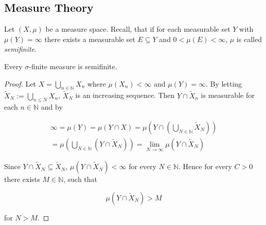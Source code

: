 \appendix
\begin{appendix}
	\section{Measure Theory}
	Let $(X,\mu)$ be a measure space. Recall, that if for each measurable set $Y$ with $\mu(Y) = \infty$ there exists a measurable set $E \subseteq Y$ and $0 < \mu(E) < \infty$, $\mu$ is called \emph{semifinite}.

		\begin{lemma}
			Every $\sigma$-finite measure is semifinite.
		\end{lemma}

		\begin{proof}
			Let $X = \bigcup_{n \in \mathbb{N}} X_n$ where $\mu(X_n) < \infty$ and $\mu(Y) = \infty$. By letting $\tilde{X}_N := \bigcup_{n \leqslant N} X_n$, $\tilde{X}_N$ is an increasing sequence. Then $Y \cap \tilde{X}_n$ is measurable for each $n \in \mathbb{N}$ and by \cite[10]{cohn:measure_theory:2013}

			\begin{multline*}
				\infty = \mu(Y) = \mu(Y \cap X) = \mu\left(Y \cap \left(\bigcup_{N \in \mathbb{N}} \tilde{X}_N\right)\right)\\ = \mu\left(\bigcup_{N \in \mathbb{N}} \left( Y \cap \tilde{X}_N \right)\right) = \lim\limits_{N \rightarrow \infty} \mu\left( Y \cap \tilde{X}_N \right)
			\end{multline*}

			Since $Y \cap \tilde{X}_N \subseteq \tilde{X}_N$, $\mu(Y \cap \tilde{X}_N) < \infty$ for every $N \in \mathbb{N}$. Hence for every $C > 0$ there exists $M \in \mathbb{N}$, such that

			\begin{equation*}
				\mu(Y \cap \tilde{X}_N) > M
			\end{equation*}

			for $N > M$. 
		\end{proof}

\end{appendix}

\printbibliography

